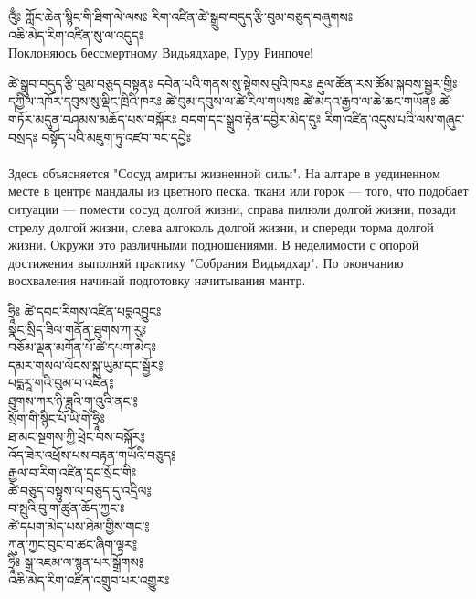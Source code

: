 
\newpage
\ru
{}
{\ti འུྃཿ ཀློང་ཆེན་སྙིང་གི་ཐིག་ལེ་ལསཿ རིག་འཛིན་ཚེ་སྒྲུབ་བདུད་རྩི་བུམ་བཅུད་བཞུགསཿ }\\

{\ti འཆི་མེད་རིག་འཛིན་སུ་ལ་འདུདཿ }\\
Поклоняюсь бессмертному Видьядхаре, Гуру Ринпоче!

{\ti ཚེ་སྒྲུབ་བདུད་རྩི་བུམ་བཅུད་བསྟནཿ དབེན་པའི་གནས་སུ་སྟེགས་བུའི་ཁརཿ རྡུལ་ཚོན་རས་ཚོམ་སྐབས་སྦྱར་གྱིཿ དཀྱིལ་འཁོར་དབུས་སུ་ལྡིང་ཁྲིའི་ཁརཿ ཚེ་བུམ་དབུས་ལ་ཚེ་རིལ་གཡསཿ ཚེ་མདའ་རྒྱབ་ལ་ཆེ་ཆང་གཡོནཿ ཚེ་གཏོར་མདུན་བཤམས་མཆོད་པས་བསྐོརཿ བདག་དང་སྒྲུབ་རྟེན་དབྱེར་མེད་དུཿ རིག་འཛིན་འདུས་པའི་ལས་གཞུང་བསྲདཿ བསྟོད་པའི་མཇུག་ཏུ་འཛབ་ཁང་དབྱེཿ }\\\\
Здесь объясняется "Сосуд амриты жизненной силы". На алтаре в уединенном месте в центре мандалы из цветного песка, ткани или горок — того, что подобает ситуации — помести сосуд долгой жизни, справа пилюли долгой жизни, позади стрелу долгой жизни, слева алгоколь долгой жизни, и спереди торма долгой жизни. Окружи это различными подношениями. В неделимости с опорой достижения выполняй практику "Собрания Видьядхар". По окончанию восхваления начинай подготовку начитывания мантр. 

{\ti
ཧྲཱིཿ ཚེ་དབང་རིགས་འཛིན་པདྨའབྱུངཿ \\
སྣང་སྲིད་ཟིལ་གནོན་ཐུགས་ཀ་རུཿ \\
བཅོམ་ལྡན་མགོན་པོ་ཚེ་དཔག་མེདཿ \\
དམར་གསལ་ལོངས་སྐུ་ཡུམ་དང་སྦྱོར༔ \\
པདྨརཱ་གའི་བུམ་པ་འཛིན༔ \\
ཐུགས་ཀར་ཉི་ཟླའི་གྭ་འུའི་ནང་༔ \\
སྲོག་གི་སྙིང་པོ་ཡི་གེ་ཧྲཱིཿ \\
ཐ་མང་སྔགས་ཀྱི་ཕྲེང་བས་བསྐོར༔ \\
འོད་ཟེར་འཕྲོས་པས་བརྟན་གཡོའི་བཅུད༔ \\
རྒྱལ་བ་རིག་འཛིན་དྲང་སྲོང་གིཿ \\
ཚེ་བཅུད་བསྟུས་ལ་བཅུད་དུ་འདྲིལ༔ \\
བ་སྤུའི་བུ་ག་ཚུན་ཆོད་ཀྱང་ཿ \\
ཚེ་དཔག་མེད་པས་ཐེམ་གྱིས་གང་༔ \\
ཀུན་ཀྱང་བུང་བ་ཚང་ཞིག་ལྟར༔\\
ཧྲཱིཿ སྒྲ་འཇམ་ལ་སྙན་པར་སྒྲོགས༔ \\
འཆི་མེད་རིག་འཛིན་འགྲུབ་པར་འགྱུརཿ \\
}\\

